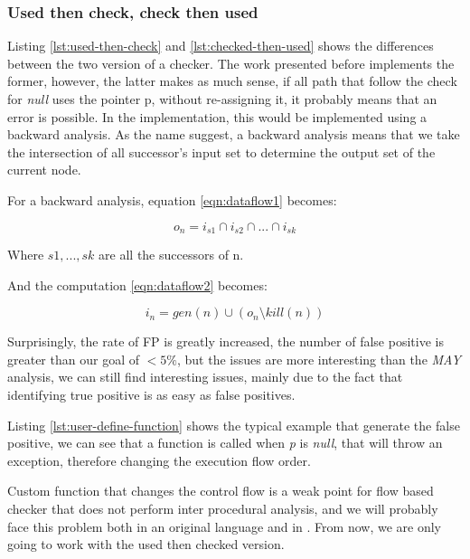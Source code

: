 \subsubsection{Used then check, check then used}
\label{subsubsec:used_then_check_check_then_used}




Listing \ref{lst:used-then-check} and \ref{lst:checked-then-used} shows the differences between the two version of a checker.
The work presented before implements the former, however, the latter makes as much sense, if all path that follow the check for \emph{null} uses the pointer p, without re-assigning it, it probably means that an error is possible.
In the implementation, this would be implemented using a backward analysis. 
As the name suggest, a backward analysis means that we take the intersection of all successor’s input set to determine the output set of the current node. 

For a backward analysis, equation \ref{eqn:dataflow1} becomes:

\begin{equation}\label{eqn:checkthenused1}
o_{n} = i_{s1}  \cap   i_{s2}  \cap  ... \cap   i_{sk}
\end{equation}

Where $s1, ..., sk$ are all the successors of n.

And the computation \ref{eqn:dataflow2} becomes:

\begin{equation}\label{eqn:checkthenused2}
i_{n} = gen(n)  \cup   (o_{n} \setminus kill(n))
\end{equation}

Surprisingly, the rate of FP is greatly increased, the number of false positive is greater than our goal of $<5\%$, but the issues are more interesting than the \emph{MAY} analysis, we can still find interesting issues, mainly due to the fact that identifying true positive is as easy as false positives.

 

Listing \ref{lst:user-define-function} shows the typical example that generate the false positive, we can see that a function is called when \emph{p} is \emph{null}, that will throw an exception, therefore changing the execution flow order.

Custom function that changes the control flow is a weak point for flow based checker that does not perform inter procedural analysis, and we will probably face this problem both in an original language and in \slang{}. From now, we are only going to work with the used then checked version.




